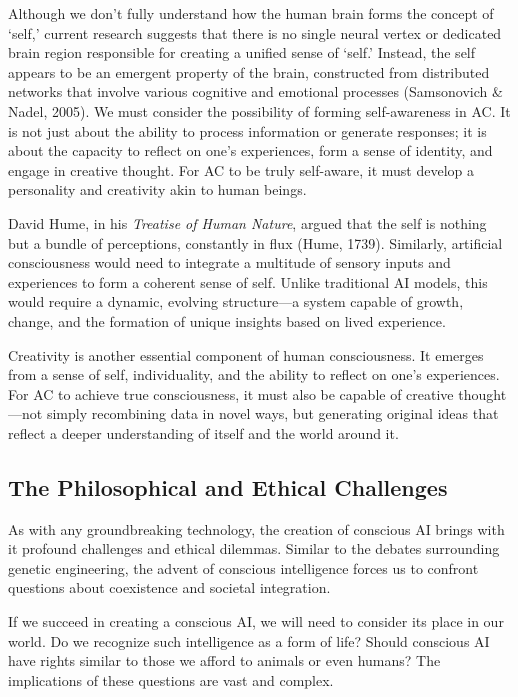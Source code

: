 \documentclass[
]{article}
\begin{document}
Although we don't fully understand how the human brain forms the concept
of `self,' current research suggests that there is no single neural
vertex or dedicated brain region responsible for creating a unified
sense of `self.' Instead, the self appears to be an emergent property of
the brain, constructed from distributed networks that involve various
cognitive and emotional processes (Samsonovich \& Nadel, 2005). We must
consider the possibility of forming self-awareness in AC. It is not just
about the ability to process information or generate responses; it is
about the capacity to reflect on one's experiences, form a sense of
identity, and engage in creative thought. For AC to be truly self-aware,
it must develop a personality and creativity akin to human beings.

David Hume, in his \emph{Treatise of Human Nature}, argued that the self
is nothing but a bundle of perceptions, constantly in flux (Hume, 1739).
Similarly, artificial consciousness would need to integrate a multitude
of sensory inputs and experiences to form a coherent sense of self.
Unlike traditional AI models, this would require a dynamic, evolving
structure---a system capable of growth, change, and the formation of
unique insights based on lived experience.

Creativity is another essential component of human consciousness. It
emerges from a sense of self, individuality, and the ability to reflect
on one's experiences. For AC to achieve true consciousness, it must also
be capable of creative thought---not simply recombining data in novel
ways, but generating original ideas that reflect a deeper understanding
of itself and the world around it.

\hypertarget{the-philosophical-and-ethical-challenges}{%
\subsection{The Philosophical and Ethical
Challenges}\label{the-philosophical-and-ethical-challenges}}

As with any groundbreaking technology, the creation of conscious AI
brings with it profound challenges and ethical dilemmas. Similar to the
debates surrounding genetic engineering, the advent of conscious
intelligence forces us to confront questions about coexistence and
societal integration.

If we succeed in creating a conscious AI, we will need to consider its
place in our world. Do we recognize such intelligence as a form of life?
Should conscious AI have rights similar to those we afford to animals or
even humans? The implications of these questions are vast and complex.
\end{document}
